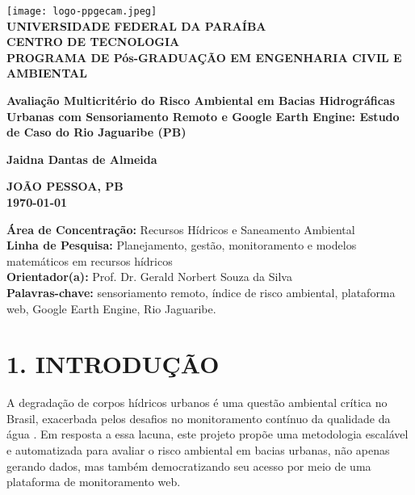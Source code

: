 \documentclass[12pt, a4paper]{article}
\begin{document}
\renewcommand{\bibname}{REFERÊNCIAS} %

\begin{titlepage}
    \centering
    \vspace*{0.5cm}
    \texttt{[image: logo-ppgecam.jpeg]}\\[0.2cm]
    \vspace*{0.5cm}
    \textbf{\small UNIVERSIDADE FEDERAL DA PARAÍBA \\
    CENTRO DE TECNOLOGIA \\
    PROGRAMA DE Pós-GRADUAÇÃO EM ENGENHARIA CIVIL E AMBIENTAL}
    \vspace{3cm}
    
    \textbf{\Huge Avaliação Multicritério do Risco Ambiental em Bacias Hidrográficas Urbanas com Sensoriamento Remoto e Google Earth Engine: Estudo de Caso do Rio Jaguaribe (PB)}
    \vspace{3cm}
    
    \textbf{\large Jaidna Dantas de Almeida}
    \vfill
    
    \textbf{JOÃO PESSOA, PB \\ \today}
\end{titlepage}

\begin{center}
    \textbf{Área de Concentração:} Recursos Hídricos e Saneamento Ambiental \\
    \textbf{Linha de Pesquisa:} Planejamento, gestão, monitoramento e modelos matemáticos em recursos hídricos \\
    \textbf{Orientador(a):} Prof. Dr. Gerald Norbert Souza da Silva \\
    \textbf{Palavras-chave:} sensoriamento remoto, índice de risco ambiental, plataforma web, Google Earth Engine, Rio Jaguaribe.
\end{center}

\newpage

\section*{1. INTRODUÇÃO}
A degradação de corpos hídricos urbanos é uma questão ambiental crítica no Brasil, exacerbada pelos desafios no monitoramento contínuo da qualidade da água \cite{santos2016}. Em resposta a essa lacuna, este projeto propõe uma metodologia escalável e automatizada para avaliar o risco ambiental em bacias urbanas, não apenas gerando dados, mas também democratizando seu acesso por meio de uma plataforma de monitoramento web.
\end{document}

